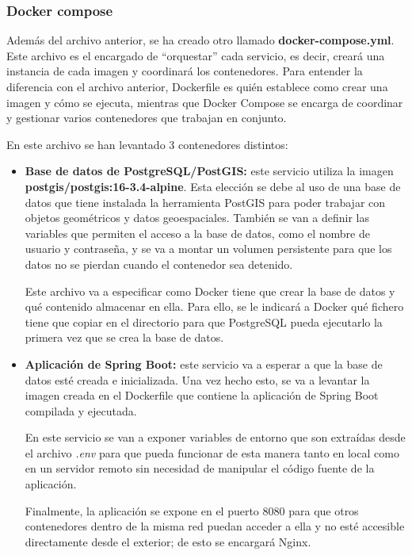 \subsubsection{Docker compose}

Además del archivo anterior, se ha creado otro llamado \textbf{docker-compose.yml}. Este archivo es el encargado de ``orquestar'' cada servicio, es decir, creará una instancia de cada imagen
y coordinará los contenedores. Para entender la diferencia con el archivo anterior, Dockerfile es quién establece como crear una imagen y cómo se ejecuta, mientras que Docker Compose se encarga
de coordinar y gestionar varios contenedores que trabajan en conjunto.

En este archivo se han levantado 3 contenedores distintos:

\begin{itemize}
    \item \textbf{Base de datos de PostgreSQL/PostGIS:} este servicio utiliza la imagen \textbf{postgis/postgis:16-3.4-alpine}. Esta elección se debe al uso de una base de datos que 
    tiene instalada la herramienta PostGIS para poder trabajar con objetos geométricos y datos geoespaciales. También se van a definir las variables que permiten el acceso a la base de datos, 
    como el nombre de usuario y contraseña, y se va a montar un volumen persistente para que los datos no se pierdan cuando el contenedor sea detenido.

    Este archivo va a especificar como Docker tiene que crear la base de datos y qué contenido almacenar en ella. Para ello, se le indicará a Docker qué fichero tiene que copiar en el directorio 
    para que PostgreSQL pueda ejecutarlo la primera vez que se crea la base de datos.

    \item \textbf{Aplicación de Spring Boot:} este servicio va a esperar a que la base de datos esté creada e inicializada. Una vez hecho esto, se va a levantar la imagen creada en el Dockerfile
    que contiene la aplicación de Spring Boot compilada y ejecutada.

    En este servicio se van a exponer variables de entorno que son extraídas desde el archivo \textit{.env} para que pueda funcionar de esta manera tanto en local como en un servidor remoto sin 
    necesidad de manipular el código fuente de la aplicación.

    Finalmente, la aplicación se expone en el puerto 8080 para que otros contenedores dentro de la misma red puedan acceder a ella y no esté accesible directamente desde el exterior; de esto se 
    encargará Nginx.


\end{itemize}
